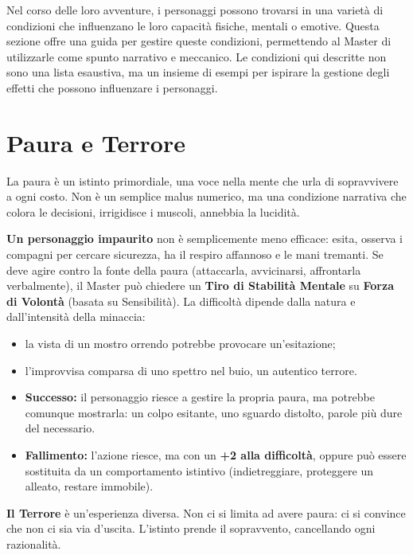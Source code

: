 \documentclass[../manuale_main.tex]{subfiles}
\begin{document}
Nel corso delle loro avventure, i personaggi possono trovarsi in una varietà di condizioni che influenzano le loro capacità fisiche, mentali o emotive. Questa sezione offre una guida per gestire queste condizioni, permettendo al Master di utilizzarle come spunto narrativo e meccanico. Le condizioni qui descritte non sono una lista esaustiva, ma un insieme di esempi per ispirare la gestione degli effetti che possono influenzare i personaggi.

\section{Paura e Terrore}

La paura è un istinto primordiale, una voce nella mente che urla di sopravvivere a ogni costo. Non è un semplice malus numerico, ma una condizione narrativa che colora le decisioni, irrigidisce i muscoli, annebbia la lucidità.

\textbf{Un personaggio impaurito} non è semplicemente meno efficace: esita, osserva i compagni per cercare sicurezza, ha il respiro affannoso e le mani tremanti. Se deve agire contro la fonte della paura (attaccarla, avvicinarsi, affrontarla verbalmente), il Master può chiedere un \textbf{Tiro di Stabilità Mentale} su \textbf{Forza di Volontà} (basata su Sensibilità). La difficoltà dipende dalla natura e dall’intensità della minaccia:

\begin{itemize}
\item la vista di un mostro orrendo potrebbe provocare un’esitazione;
\item l’improvvisa comparsa di uno spettro nel buio, un autentico terrore.
\end{itemize}

\begin{itemize}
\item \textbf{Successo:} il personaggio riesce a gestire la propria paura, ma potrebbe comunque mostrarla: un colpo esitante, uno sguardo distolto, parole più dure del necessario.
\item \textbf{Fallimento:} l’azione riesce, ma con un \textbf{+2 alla difficoltà}, oppure può essere sostituita da un comportamento istintivo (indietreggiare, proteggere un alleato, restare immobile).
\end{itemize}

\textbf{Il Terrore} è un'esperienza diversa. Non ci si limita ad avere paura: ci si convince che non ci sia via d’uscita. L’istinto prende il sopravvento, cancellando ogni razionalità.
\end{document}
